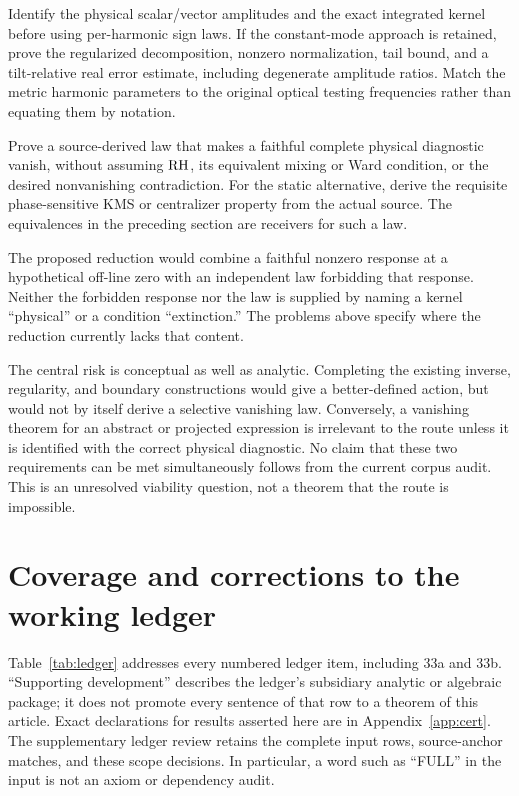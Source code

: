 \begin{problem}
Identify the physical scalar/vector amplitudes and the exact integrated kernel before using per-harmonic sign laws. If the constant-mode approach is retained, prove the regularized decomposition, nonzero normalization, tail bound, and a tilt-relative real error estimate, including degenerate amplitude ratios. Match the metric harmonic parameters to the original optical testing frequencies rather than equating them by notation.
\end{problem}

\begin{problem}\label{prob:producer}
Prove a source-derived law that makes a faithful complete physical diagnostic vanish, without assuming \(\mathrm{RH}\), its equivalent mixing or Ward condition, or the desired nonvanishing contradiction. For the static alternative, derive the requisite phase-sensitive KMS or centralizer property from the actual source. The equivalences in the preceding section are receivers for such a law.
\end{problem}

The proposed reduction would combine a faithful nonzero response at a hypothetical off-line zero with an independent law forbidding that response. Neither the forbidden response nor the law is supplied by naming a kernel ``physical'' or a condition ``extinction.'' The problems above specify where the reduction currently lacks that content.

The central risk is conceptual as well as analytic. Completing the existing inverse, regularity, and boundary constructions would give a better-defined action, but would not by itself derive a selective vanishing law. Conversely, a vanishing theorem for an abstract or projected expression is irrelevant to the route unless it is identified with the correct physical diagnostic. No claim that these two requirements can be met simultaneously follows from the current corpus audit. This is an unresolved viability question, not a theorem that the route is impossible.

\section{Coverage and corrections to the working ledger}

Table~\ref{tab:ledger} addresses every numbered ledger item, including 33a and 33b. ``Supporting development'' describes the ledger's subsidiary analytic or algebraic package; it does not promote every sentence of that row to a theorem of this article. Exact declarations for results asserted here are in Appendix~\ref{app:cert}. The supplementary ledger review retains the complete input rows, source-anchor matches, and these scope decisions. In particular, a word such as ``FULL'' in the input is not an axiom or dependency audit.

